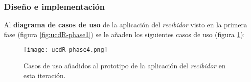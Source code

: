 \subsubsection{Diseño e implementación}
Al \textbf{diagrama de casos de uso} de la aplicación del \emph{recibidor}
visto en la primera fase (figura \ref{fig:ucdR-phase1}) se le añaden los
siguientes casos de uso (figura \ref{fig:ucdR-phase4}):

  \begin{figure}[H]
    \begin{center}
      \texttt{[image: ucdR-phase4.png]}
      \caption{Casos de uso añadidos al prototipo de la aplicación
      del \emph{recibidor} en esta iteración.}
      \label{fig:ucdR-phase4}
    \end{center}
  \end{figure}

